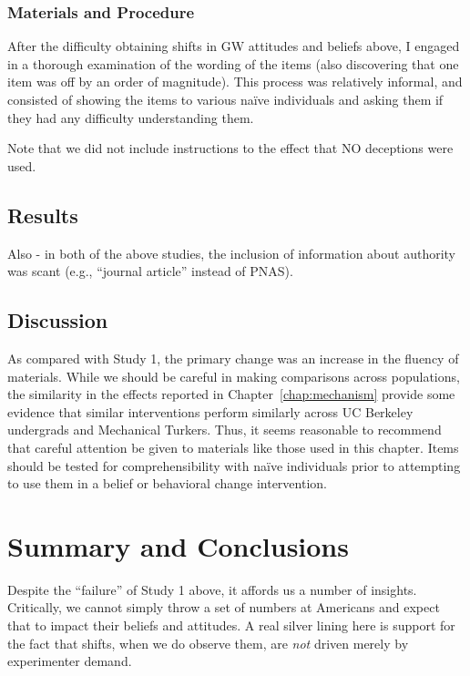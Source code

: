 \subsubsection{Materials and Procedure}

After the difficulty obtaining shifts in GW attitudes and beliefs above, I
engaged in a thorough examination of the wording of the items (also discovering
that one item was off by an order of magnitude). This process was relatively
informal, and consisted of showing the items to various naïve individuals and
asking them if they had any difficulty understanding them.

Note that we did not include instructions to the effect that NO deceptions were
used.

\subsection{Results}


Also - in both of the above studies, the inclusion of information about
authority was scant (e.g., “journal article” instead of PNAS).

\subsection{Discussion}

As compared with Study 1, the primary change was an increase in the fluency of
materials. While we should be careful in making comparisons across populations,
the similarity in the effects reported in Chapter~\ref{chap:mechanism} provide
some evidence that similar interventions perform similarly across UC Berkeley
undergrads and Mechanical Turkers. Thus, it seems reasonable to recommend that
careful attention be given to materials like those used in this chapter. Items
should be tested for comprehensibility with naïve individuals prior to
attempting to use them in a belief or behavioral change intervention.

\section{Summary and Conclusions}

Despite the “failure” of Study 1 above, it affords us a number of insights.
Critically, we cannot simply throw a set of numbers at Americans and expect that
to impact their beliefs and attitudes. A real silver lining here is
support for the fact that shifts, when we do observe them, are \emph{not} driven
merely by experimenter demand.

